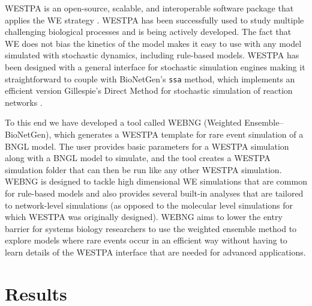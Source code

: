 \documentclass[10pt,letterpaper]{article}
\begin{document}
WESTPA is an open-source, scalable, and interoperable software package that applies the WE strategy \cite{westpa2022}. WESTPA has been successfully used to study multiple challenging biological processes \cite{weu1,weu2,weu3,weu4,weu5}
and is being actively developed. The fact that WE does not bias the kinetics of the model makes it easy to use with any model simulated with stochastic dynamics, including rule-based models. WESTPA has been designed with a general interface for stochastic simulation engines making it straightforward to couple with BioNetGen's \texttt{ssa} method, which implements an efficient version Gillespie's Direct Method \cite{gillespie1977exact} for stochastic simulation of reaction networks \cite{harris2016bionetgen}. 


To this end we have developed a tool called WEBNG (Weighted Ensemble--BioNetGen), which generates a WESTPA template for rare event simulation of a BNGL model. The user provides basic parameters for a WESTPA simulation along with a BNGL model to simulate, and the tool creates a WESTPA simulation folder that can then be run like any other WESTPA simulation. WEBNG is designed to tackle high dimensional WE simulations that are common for rule-based models and also provides several built-in analyses that are tailored to network-level simulations (as opposed to the molecular level simulations for which WESTPA was originally designed). WEBNG aims to lower the entry barrier for systems biology researchers to use the weighted ensemble method to explore models where rare events occur in an efficient way without having to learn details of the WESTPA interface that are needed for advanced applications.

\section*{Results}
\end{document}

